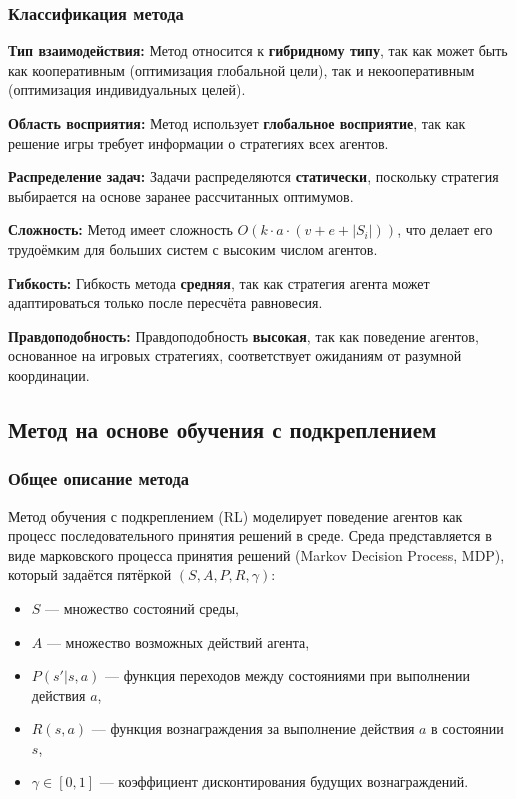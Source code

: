\subsubsection*{Классификация метода}
\textbf{Тип взаимодействия:}  
Метод относится к \textbf{гибридному типу}, так как может быть как кооперативным (оптимизация глобальной цели), так и некооперативным (оптимизация индивидуальных целей).

\textbf{Область восприятия:}  
Метод использует \textbf{глобальное восприятие}, так как решение игры требует информации о стратегиях всех агентов.

\textbf{Распределение задач:}  
Задачи распределяются \textbf{статически}, поскольку стратегия выбирается на основе заранее рассчитанных оптимумов.

\textbf{Сложность:}  
Метод имеет сложность $O(k \cdot a \cdot (v + e + |S_i|))$, что делает его трудоёмким для больших систем с высоким числом агентов.

\textbf{Гибкость:}  
Гибкость метода \textbf{средняя}, так как стратегия агента может адаптироваться только после пересчёта равновесия.

\textbf{Правдоподобность:}  
Правдоподобность \textbf{высокая}, так как поведение агентов, основанное на игровых стратегиях, соответствует ожиданиям от разумной координации.

\subsection{Метод на основе обучения с подкреплением}

\subsubsection*{Общее описание метода}
Метод обучения с подкреплением (RL) моделирует поведение агентов как процесс последовательного принятия решений в среде.
Среда представляется в виде марковского процесса принятия решений (Markov Decision Process, MDP), который задаётся пятёркой $(S, A, P, R, \gamma)$:
\begin{itemize}
	\item $S$ — множество состояний среды,
	\item $A$ — множество возможных действий агента,
	\item $P(s' | s, a)$ — функция переходов между состояниями при выполнении действия $a$,
	\item $R(s, a)$ — функция вознаграждения за выполнение действия $a$ в состоянии $s$,
	\item $\gamma \in [0, 1]$ — коэффициент дисконтирования будущих вознаграждений.
\end{itemize}

